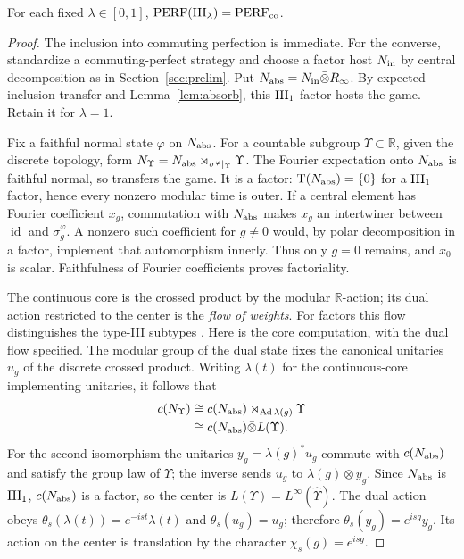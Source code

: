 \begin{theorem}\label{thm:III}
For each fixed $\lambda\in[0,1]$,
$\mathrm{PERF}(\mathrm{III}_\lambda)=\mathrm{PERF}_{\mathrm{co}}$.
\end{theorem}
\begin{proof}
The inclusion into commuting perfection is immediate.
For the converse, standardize a commuting-perfect strategy and
choose a factor host $N_{\rm in}$ by central decomposition as in
Section~\ref{sec:prelim}. Put $N_{\rm abs}=N_{\rm in}\bar\otimes R_\infty$.
By expected-inclusion transfer and Lemma~\ref{lem:absorb}, this $\mathrm{III}_1$
factor hosts the game. Retain it for $\lambda=1$.

Fix a faithful normal state $\varphi$ on $N_{\rm abs}$.
For a countable subgroup $\Upsilon\subset\mathbb R$, given the discrete
topology, form
$N_\Upsilon=N_{\rm abs}\rtimes_{\sigma^\varphi|_\Upsilon}\Upsilon$.
The Fourier expectation onto $N_{\rm abs}$ is faithful normal, so transfers
the game. It is a factor: $\mathrm T(N_{\rm abs})=\{0\}$ for a $\mathrm{III}_1$ factor, hence
every nonzero modular time is outer.
If a central element has Fourier coefficient $x_g$, commutation
with $N_{\rm abs}$ makes $x_g$ an intertwiner between $\operatorname{id}$ and
$\sigma_g^\varphi$. A nonzero such coefficient for $g\ne0$ would,
by polar decomposition in a factor, implement that automorphism
innerly. Thus only $g=0$ remains, and $x_0$ is scalar.
Faithfulness of Fourier coefficients proves factoriality.

The continuous core is the crossed product by the modular
$\mathbb R$-action; its dual action restricted to the center is the
\emph{flow of weights}. For factors this flow distinguishes the
type-III subtypes \cite{ConnesTakesaki}.
Here is the core computation, with the dual flow specified.
The modular group of the dual state fixes the canonical unitaries
$u_g$ of the discrete crossed product. Writing $\lambda(t)$ for
the continuous-core implementing unitaries, it follows that
\begin{equation}\label{eq:core}
 \begin{split}
 c(N_\Upsilon)
 &\cong c(N_{\rm abs})\rtimes_{\operatorname{Ad}\lambda(g)}\Upsilon\\
 &\cong c(N_{\rm abs})\bar\otimes L(\Upsilon).
 \end{split}
\end{equation}
For the second isomorphism the unitaries
$y_g=\lambda(g)^*u_g$ commute with $c(N_{\rm abs})$ and satisfy the group
law of $\Upsilon$; the inverse sends $u_g$ to $\lambda(g)\otimes y_g$.
Since $N_{\rm abs}$ is $\mathrm{III}_1$, $c(N_{\rm abs})$ is a factor, so the center is
$L(\Upsilon)=L^\infty(\widehat\Upsilon)$.
The dual action obeys
$\theta_s(\lambda(t))=e^{-ist}\lambda(t)$ and
$\theta_s(u_g)=u_g$; therefore
$\theta_s(y_g)=e^{isg}y_g$.
Its action on the center is translation by the character
$\chi_s(g)=e^{isg}$.


\end{proof}
